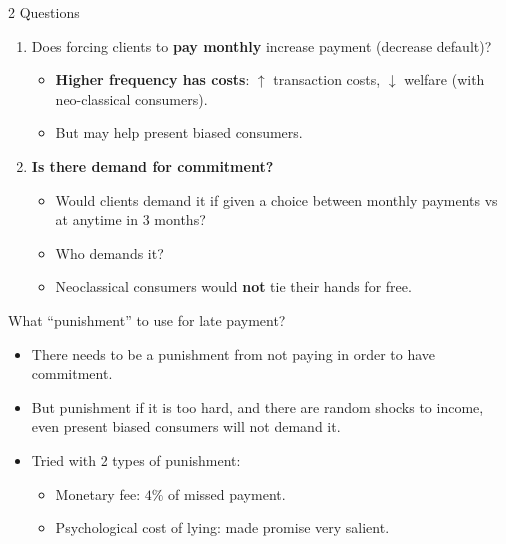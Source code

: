 \documentclass[9pt]{beamer}
\begin{document}
\begin{frame}{2 Questions}
        \begin{enumerate}
 \item Does forcing clients to \textbf{pay monthly} increase payment (decrease default)?
    \begin{itemize}
        \item \textbf{Higher frequency has costs}: $\uparrow$ transaction costs, $\downarrow$  welfare (with neo-classical consumers).
        \item But may help present biased consumers. 
    \end{itemize}
    
    \vfill
    \pause
    \item \textbf{Is there demand for commitment?}
        \begin{itemize}
            \item Would clients demand it if given a choice between monthly payments vs at anytime in 3 months?
            \item Who demands it?
            \item Neoclassical consumers would \textbf{not} tie their hands for free.
        \end{itemize}
\end{enumerate}
\end{frame}




\begin{frame}{What ``punishment'' to use for late payment?}

\begin{itemize}
    \item There needs to be a punishment from not paying in order to have commitment.
    \vfill
    \item But punishment if it is too hard, and there are random shocks to income, even present biased consumers will not demand it.
    \vfill 
    \item Tried with 2 types of punishment:
    \begin{itemize}
        \item Monetary fee: $4\%$ of missed payment.
        \item Psychological cost of lying: made promise very salient.
    \end{itemize}
\end{itemize}
\end{frame}
\end{document}
